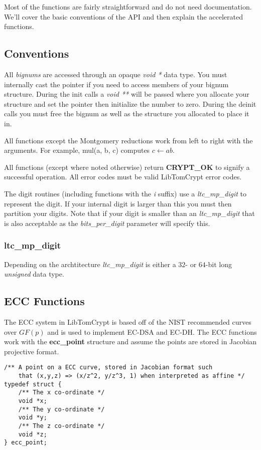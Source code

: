 \documentclass[synpaper]{book}
\begin{document}
Most of the functions are fairly straightforward and do not need documentation.  We'll cover the basic conventions of the API and then explain the accelerated functions.

\subsection{Conventions}

All \textit{bignums} are accessed through an opaque \textit{void *} data type.  You must internally cast the pointer if you need to access members of your bignum structure.  During
the init calls a \textit{void **} will be passed where you allocate your structure and set the pointer then initialize the number to zero.  During the deinit calls you must
free the bignum as well as the structure you allocated to place it in.

All functions except the Montgomery reductions work from left to right with the arguments.  For example, mul(a, b, c) computes $c \leftarrow ab$.

All functions (except where noted otherwise) return \textbf{CRYPT\_OK} to signify a successful operation.  All error codes must be valid LibTomCrypt error codes.

The digit routines (including functions with the \textit{i} suffix) use a \textit{ltc\_mp\_digit} to represent the digit.  If your internal digit is larger than this you must
then partition your digits.  Note that if your digit is smaller than an \textit{ltc\_mp\_digit} that is also acceptable as the \textit{bits\_per\_digit} parameter will specify this.

\subsubsection{ltc\_mp\_digit}

Depending on the archtitecture \textit{ltc\_mp\_digit} is either a $32$- or $64$-bit long \textit{unsigned} data type.

\subsection{ECC Functions}
The ECC system in LibTomCrypt is based off of the NIST recommended curves over $GF(p)$ and is used to implement EC-DSA and EC-DH.   The ECC functions work with
the \textbf{ecc\_point} structure and assume the points are stored in Jacobian projective format.

\begin{verbatim}
/** A point on a ECC curve, stored in Jacobian format such
    that (x,y,z) => (x/z^2, y/z^3, 1) when interpreted as affine */
typedef struct {
    /** The x co-ordinate */
    void *x;
    /** The y co-ordinate */
    void *y;
    /** The z co-ordinate */
    void *z;
} ecc_point;
\end{verbatim}
\end{document}

